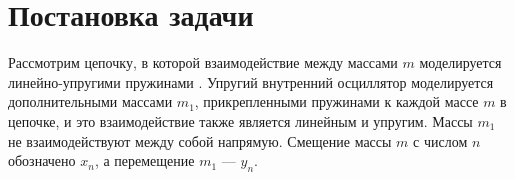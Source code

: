 \section{Постановка задачи}


Рассмотрим цепочку, в которой взаимодействие между массами $ m $ моделируется линейно-упругими пружинами \cite {Huang2009, Huang2010}. Упругий внутренний осциллятор моделируется дополнительными массами $ m_1 $, прикрепленными пружинами к каждой массе $ m $ в цепочке, и это взаимодействие также является линейным и упругим. Массы $ m_1 $ не взаимодействуют между собой напрямую. Смещение массы $ m $ с числом $ n $ обозначено $ x_n $, а перемещение $ m_1 $ --- $ y_n $. 

